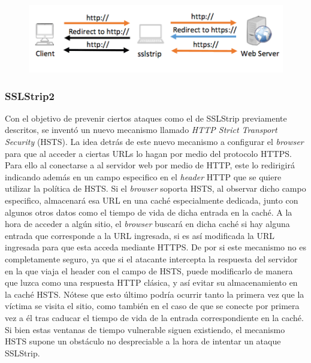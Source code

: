 \documentclass[10pt,a4paper]{article}
\begin{document}
\begin{figure}[H]
\centerline{\includegraphics[scale=0.8]{images/sslstrip_redirect.png}}
\caption{}
\end{figure}


\subsubsection{SSLStrip2}

Con el objetivo de prevenir ciertos ataques como el de SSLStrip previamente descritos, se inventó un nuevo mecanismo llamado \textit{HTTP Strict Transport Security} (HSTS). La idea detrás de este nuevo mecanismo a configurar el \textit{browser} para que al acceder a ciertas URLs lo hagan por medio del protocolo HTTPS. Para ello al conectarse a al servidor web por medio de HTTP, este lo redirigirá indicando además en un campo especifico en el \textit{header} HTTP que se quiere utilizar la política de HSTS. Si el \textit{browser} soporta HSTS, al observar dicho campo especifico, almacenará esa URL en una caché especialmente dedicada, junto con algunos otros datos como el tiempo de vida de dicha entrada en la caché. A la hora de acceder a algún sitio, el \textit{browser} buscará en dicha caché si hay alguna entrada que corresponde a la URL ingresada, si es así modificada la URL ingresada para que esta acceda mediante HTTPS. De por si este mecanismo no es completamente seguro, ya que si el atacante intercepta la respuesta del servidor en la que viaja el header con el campo de HSTS, puede modificarlo de manera que luzca como una respuesta HTTP clásica, y así evitar su almacenamiento en la caché HSTS. Nótese que esto último podría ocurrir tanto la primera vez que la víctima se visita el sitio, como también en el caso de que se conecte por primera vez a él tras caducar el tiempo de vida de la entrada correspondiente en la caché. Si bien estas ventanas de tiempo vulnerable siguen existiendo, el mecanismo HSTS supone un obstáculo no despreciable a la hora de intentar un ataque SSLStrip.
\end{document}
